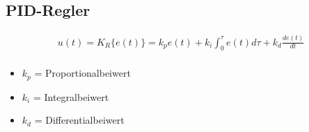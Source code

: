 \documentclass[german]{latex4ei/latex4ei_sheet}
\begin{document}
    \subsection{PID-Regler}
    \begin{sectionbox}
        \begin{align*}
            u(t) = K_R\{e(t)\} = k_p e(t) + k_i \int_0^\tau e(t) d\tau + k_d \frac{de(t)}{dt} \\
        \end{align*}
        \begin{itemize}
            \item $k_p$ = Proportionalbeiwert
            \item $k_i$ = Integralbeiwert
            \item $k_d$ = Differentialbeiwert
        \end{itemize}
\end{sectionbox}
\end{document}
